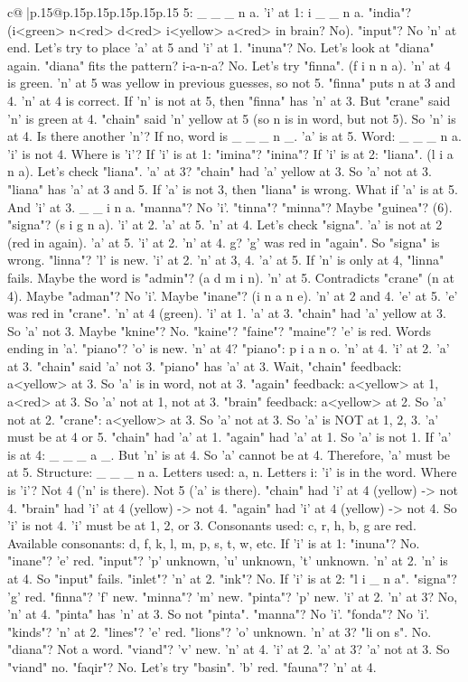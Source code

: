 \documentclass{article}
\begin{document}
{\begin{supertabular}{c@{$\;$}|p{.15\linewidth}@{}p{.15\linewidth}p{.15\linewidth}p{.15\linewidth}p{.15\linewidth}p{.15\linewidth}}
{{{5: \_ \_ \_ n a. 'i' at 1: i \_ \_ n a. "india"? (i<green> n<red> d<red> i<yellow> a<red> in brain? No). "input"? No 'n' at end. Let's try to place 'a' at 5 and 'i' at 1. "inuna"? No. Let's look at "diana" again. "diana" fits the pattern? i{-}a{-}n{-}a? No. Let's try "finna". (f i n n a). 'n' at 4 is green. 'n' at 5 was yellow in previous guesses, so not 5. "finna" puts n at 3 and 4. 'n' at 4 is correct. If 'n' is not at 5, then "finna" has 'n' at 3. But "crane" said 'n' is green at 4. "chain" said 'n' yellow at 5 (so n is in word, but not 5). So 'n' is at 4. Is there another 'n'? If no, word is \_ \_ \_ n \_. 'a' is at 5. Word: \_ \_ \_ n a. 'i' is not 4. Where is 'i'? If 'i' is at 1: "imina"? "inina"? If 'i' is at 2: "liana". (l i a n a). Let's check "liana". 'a' at 3? "chain" had 'a' yellow at 3. So 'a' not at 3. "liana" has 'a' at 3 and 5. If 'a' is not 3, then "liana" is wrong. What if 'a' is at 5. And 'i' at 3. \_ \_ i n a. "manna"? No 'i'. "tinna"? "minna"? Maybe "guinea"? (6). "signa"? (s i g n a). 'i' at 2. 'a' at 5. 'n' at 4. Let's check "signa". 'a' is not at 2 (red in again). 'a' at 5. 'i' at 2. 'n' at 4. g? 'g' was red in "again". So "signa" is wrong. "linna"? 'l' is new. 'i' at 2. 'n' at 3, 4. 'a' at 5. If 'n' is only at 4, "linna" fails. Maybe the word is "admin"? (a d m i n). 'n' at 5. Contradicts "crane" (n at 4). Maybe "adman"? No 'i'. Maybe "inane"? (i n a n e). 'n' at 2 and 4. 'e' at 5. 'e' was red in "crane". 'n' at 4 (green). 'i' at 1. 'a' at 3. "chain" had 'a' yellow at 3. So 'a' not 3. Maybe "knine"? No. "kaine"? "faine"? "maine"? 'e' is red. Words ending in 'a'. "piano"? 'o' is new. 'n' at 4? "piano": p i a n o. 'n' at 4. 'i' at 2. 'a' at 3. "chain" said 'a' not 3. "piano" has 'a' at 3. Wait, "chain" feedback: a<yellow> at 3. So 'a' is in word, not at 3. "again" feedback: a<yellow> at 1, a<red> at 3. So 'a' not at 1, not at 3. "brain" feedback: a<yellow> at 2. So 'a' not at 2. "crane": a<yellow> at 3. So 'a' not at 3. So 'a' is NOT at 1, 2, 3. 'a' must be at 4 or 5. "chain" had 'a' at 1. "again" had 'a' at 1. So 'a' is not 1. If 'a' is at 4: \_ \_ \_ a \_. But 'n' is at 4. So 'a' cannot be at 4. Therefore, 'a' must be at 5. Structure: \_ \_ \_ n a. Letters used: a, n. Letters i: 'i' is in the word. Where is 'i'? Not 4 ('n' is there). Not 5 ('a' is there). "chain" had 'i' at 4 (yellow) {-}> not 4. "brain" had 'i' at 4 (yellow) {-}> not 4. "again" had 'i' at 4 (yellow) {-}> not 4. So 'i' is not 4. 'i' must be at 1, 2, or 3. Consonants used: c, r, h, b, g are red. Available consonants: d, f, k, l, m, p, s, t, w, etc. If 'i' is at 1: "inuna"? No. "inane"? 'e' red. "input"? 'p' unknown, 'u' unknown, 't' unknown. 'n' at 2. 'n' is at 4. So "input" fails. "inlet"? 'n' at 2. "ink"? No. If 'i' is at 2: "l i \_ n a". "signa"? 'g' red. "finna"? 'f' new. "minna"? 'm' new. "pinta"? 'p' new. 'i' at 2. 'n' at 3? No, 'n' at 4. "pinta" has 'n' at 3. So not "pinta". "manna"? No 'i'. "fonda"? No 'i'. "kinds"? 'n' at 2. "lines"? 'e' red. "lions"? 'o' unknown. 'n' at 3? "li on s". No. "diana"? Not a word. "viand"? 'v' new. 'n' at 4. 'i' at 2. 'a' at 3? 'a' not at 3. So "viand" no. "faqir"? No. Let's try "basin". 'b' red. "fauna"? 'n' at 4. }}}
\end{supertabular}}
\end{document}

